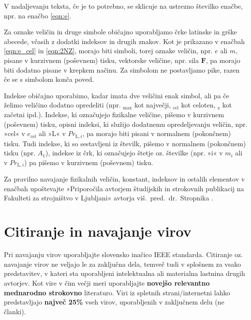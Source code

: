V nadaljevanju teksta, če je to potrebno, se sklicuje na ustrezno številko 
enačbe, npr. na enačbo \eqref{eqn:e}.

Za oznake veličin in druge simbole običajno uporabljamo črke latinske in grške 
abecede, včasih z dodatki indeksov in drugih znakov. Kot je prikazano v enačbah 
\eqref{eqn:e_cel} in \eqref{eqn:2NZ}, morajo biti simboli, torej oznake veličin, 
npr. $e$ ali $m$, pisane v kurzivnem (poševnem) tisku, vektorske veličine, npr. sila $\bm{F}$, pa morajo biti dodatno pisane v krepkem načinu. Za simbolom ne postavljamo pike, razen če se s simbolom konča poved.

Indekse običajno uporabimo, kadar imata dve veličini enak simbol, ali pa če 
želimo veličino dodatno opredeliti (npr. $_{\text{max}}$ kot največji, 
$_{\text{cel}}$ kot celoten, $_{\text{z}}$ kot začetni ipd.). Indekse, ki 
označujejo fizikalne veličine, pišemo v kurzivnem (poševnem) tisku, opisni 
indeksi, ki služijo dodatnemu opredeljevanju veličin, npr. »cel« v 
$e_{\text{cel}}$ ali »L« v $Pr_{\text{L},i}$, pa morajo biti pisani v normalnem 
(pokončnem) tisku. Tudi indekse, ki so sestavljeni iz številk, pišemo v 
normalnem (pokončnem) tisku (npr. $A_1$), indekse iz črk, ki označujejo štetje 
oz. številke (npr. »i« v $m_i$ ali v $Pr_{\text{L},i}$) pa pišemo v kurzivnem 
(poševnem) tisku.

Za pravilno navajanje fizikalnih veličin, konstant, indeksov in ostalih 
elementov v enačbah upoštevajte »Priporočila avtorjem študijskih in strokovnih 
publikacij na Fakulteti za strojništvo v Ljubljani« avtorja 
viš.~pred.~dr.~Stropnika \cite{stropnik_1997}.

\section{Citiranje in navajanje virov}\label{sec:citiranje}

Pri navajanju virov uporabljajte slovensko inačico IEEE standarda. Citiranje 
oz. navajanje virov ne veljajo le za zaključna dela, temveč tudi v splošnem za 
vsako predstavitev, v kateri sta uporabljeni intelektualna ali materialna 
lastnina drugih avtorjev. Kot vire v čim večji meri uporabljajte 
\textbf{novejšo relevantno mednarodno strokovno} literaturo. Viri iz spletnih 
strani/internetni lahko predstavljajo \textbf{največ 25\%} vseh virov, 
uporabljenih v zaključnem delu (ne članki).

